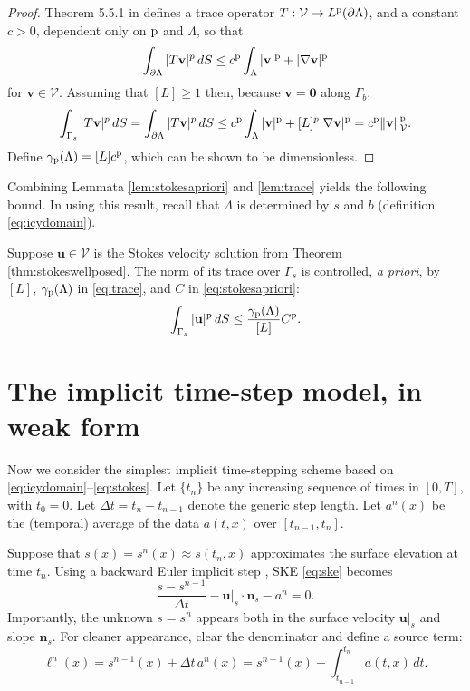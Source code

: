 \documentclass[hidelinks,onefignum,onetabnum,final]{siamart220329}  %
\newcommand{\grad}{\nabla}
\newcommand{\bn}{\mathbf{n}}
\newcommand{\bu}{\mathbf{u}}
\newcommand{\bv}{\mathbf{v}}
\newcommand{\bzero}{\bm{0}}
\newcommand{\cV}{\mathcal{V}}
\newcommand{\pp}{{\text{\textnormal{p}}}}
\begin{document}
\begin{proof}
Theorem 5.5.1 in \cite{Evans2010} defines a trace operator $T:\cV\to L^\pp(\partial\Lambda)$, and a constant $c>0$, dependent only on $\pp$ and $\Lambda$, so that
\begin{equation}
\int_{\partial\Lambda} |T\bv|^p\,dS \le c^\pp \int_{\Lambda} |\bv|^\pp + |\grad\bv|^\pp \label{eq:tracework}
\end{equation}
for $\bv\in\cV$.  Assuming that $[L] \ge 1$ then, because $\bv=\bzero$ along $\Gamma_b$,
\begin{equation}
\int_{\Gamma_s} |T\bv|^p\,dS = \int_{\partial\Lambda} |T\bv|^p\,dS \le c^\pp \int_{\Lambda} |\bv|^\pp + [L]^p |\grad\bv|^\pp = c^\pp \|\bv\|_{\cV}^\pp. \label{eq:traceworktwo}
\end{equation}
Define $\gamma_{\pp}(\Lambda)=[L] c^\pp$, which can be shown to be dimensionless.
\end{proof}

Combining Lemmata \ref{lem:stokesapriori} and \ref{lem:trace} yields the following bound.  In using this result, recall that $\Lambda$ is determined by $s$ and $b$ (definition \eqref{eq:icydomain}).

\begin{corollary} \label{cor:surfacetracebound}
Suppose $\bu\in\cV$ is the Stokes velocity solution from Theorem \ref{thm:stokeswellposed}.  The norm of its trace over $\Gamma_s$ is controlled, \emph{a priori}, by $[L]$, $\gamma_{\pp}(\Lambda)$ in \eqref{eq:trace}, and $C$ in \eqref{eq:stokesapriori}:
\begin{equation}
\int_{\Gamma_s} |\bu|^\pp \,dS \le \frac{\gamma_{\pp}(\Lambda)}{[L]} C^\pp. \label{eq:surfacetracebound}
\end{equation}
\end{corollary}


\section{The implicit time-step model, in weak form} \label{sec:model}

Now we consider the simplest implicit time-stepping scheme based on \eqref{eq:icydomain}--\eqref{eq:stokes}.  Let $\{t_n\}$ be any increasing sequence of times in $[0,T]$, with $t_0=0$.  Let $\Delta t = t_n-t_{n-1}$ denote the generic step length.  Let $a^n(x)$ be the (temporal) average of the data $a(t,x)$ over $[t_{n-1},t_n]$.

Suppose that $s(x)=s^n(x)\approx s(t_n,x)$ approximates the surface elevation at time $t_n$.  Using a backward Euler implicit step \cite{AscherPetzold1998}, SKE \eqref{eq:ske} becomes
\begin{equation}
\frac{s - s^{n-1}}{\Delta t} - \bu|_{s} \cdot \bn_{s} - a^n = 0. \label{eq:be:ske}
\end{equation}
Importantly, the unknown $s=s^n$ appears both in the surface velocity $\bu|_s$ and slope $\bn_s$.  For cleaner appearance, clear the denominator and define a source term:
\begin{equation}
\ell^n(x) = s^{n-1}(x)+\Delta t\,a^n(x) = s^{n-1}(x) + \int_{t_{n-1}}^{t_n} a(t,x)\,dt. \label{eq:be:source}
\end{equation}
\end{document}
